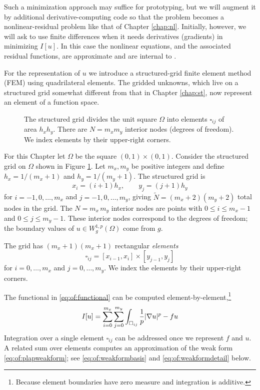 Such a minimization approach may suffice for prototyping, but we will augment it by additional derivative-computing code so that the problem becomes a nonlinear-residual problem like that of Chapter \ref{chap:nl}.  Initially, however, we will ask \PETSc to use finite differences when it needs derivatives (gradients) in minimizing $I[u]$.  In this case the nonlinear equations, and the associated residual functions, are approximate and are internal to \PETSc.

For the representation of $u$ we introduce a structured-grid finite element method (FEM) using quadrilateral elements.  The gridded unknowns, which live on a structured grid somewhat different from that in Chapter \ref{chap:st}, now represent an element of a function space.

\begin{figure}

\caption{The structured grid divides the unit square $\Omega$ into elements $\square_{ij}$ of area $h_x h_y$.  There are $N=m_x m_y$ interior nodes (degrees of freedom).  We index elements by their upper-right corners.}
\label{fig:of:q1grid}
\end{figure}

For this Chapter let $\Omega$ be the square $(0,1)\times (0,1)$.  Consider the structured grid on $\Omega$ shown in Figure \ref{fig:of:q1grid}.  Let $m_x,m_y$ be positive integers and define $h_x = 1/(m_x+1)$ and $h_y = 1/(m_y+1)$.  The structured grid is
\begin{equation}
x_i = (i+1) h_x, \qquad y_j = (j+1) h_y \label{eq:of:structuredgridindexing}
\end{equation}
for $i=-1,0,\dots,m_x$ and $j=-1,0,\dots,m_y$, giving $\tilde N = (m_x+2)(m_y+2)$ total nodes in the grid.  The $N=m_x\, m_y$ interior nodes are points with $0 \le i \le m_x-1$ and $0 \le j \le m_y-1$.  These interior nodes correspond to the degrees of freedom; the boundary values of $u\in W_g^{1,p}(\Omega)$ come from $g$. 

The grid has $(m_x+1)(m_x+1)$ rectangular \emph{elements}
   $$\square_{ij} = [x_{i-1},x_i] \times [y_{j-1},y_j]$$
for $i=0,\dots,m_x$ and $j=0,\dots,m_y$.  We index the elements by their upper-right corners.

The functional in \eqref{eq:of:functional} can be computed element-by-element,\footnote{Because element boundaries have zero measure and integration is additive.}
\begin{equation}
I[u] = \sum_{i=0}^{m_x} \sum_{j=0}^{m_y} \int_{\square_{ij}} \frac{1}{p} |\nabla u|^p - fu  \label{eq:of:sumoverelements}
\end{equation}
Integration over a single element $\square_{ij}$ can be addressed once we represent $f$ and $u$.  A related sum over elements computes an approximation of the weak form \eqref{eq:of:plapweakform}; see \eqref{eq:of:weakformbasis} and \eqref{eq:of:weakformdetail} below.

